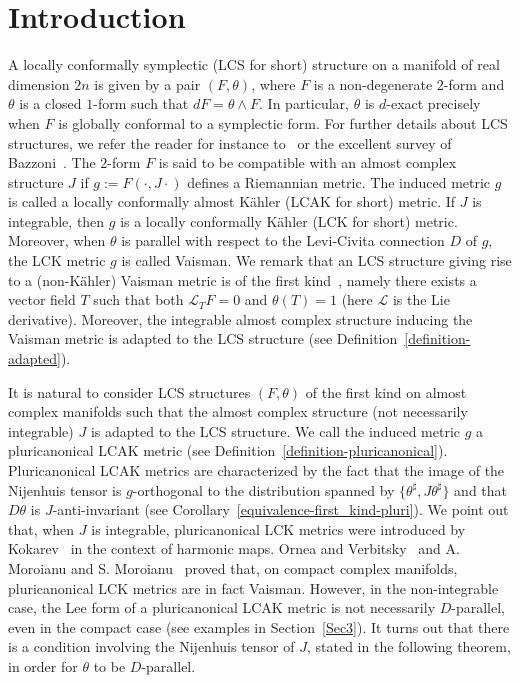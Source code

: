 \documentclass[a4paper,11pt]{amsart}
\theoremstyle{definition}
\renewcommand{\[}{\begin{equation*}}
\renewcommand{\]}{\end{equation*}}
\begin{document}
  \section{Introduction}
  A locally conformally symplectic (LCS for short) structure on a manifold of real dimension $2n$ is given by a pair $(F,\theta)$, where $F$ is a non-degenerate $2$-form and $\theta$ is a closed $1$-form such that $dF=\theta\wedge F.$ In particular, $\theta$ is $d$-exact precisely when $F$ is globally conformal to a symplectic form. For further details about LCS structures, we refer the reader for instance to~\cite{MR1481969,MR4771164} or the excellent survey of Bazzoni~\cite{MR3880223}. The $2$-form $F$ is said to be compatible with an almost complex structure $J$ if $g:=F(\cdot,J\cdot)$ defines a Riemannian metric. The induced metric $g$ is called a locally conformally almost K\"ahler (LCAK for short) metric. If $J$ is integrable, then $g$ is a locally conformally K\"ahler (LCK for short) metric. Moreover, when $\theta$ is parallel with respect to the Levi-Civita connection $D$ of $g$, the LCK metric $g$ is called Vaisman. We remark that an LCS structure giving rise to a (non-K\"ahler) Vaisman metric is of the first kind~\cite{MR809073}, namely there exists a vector field $T$ such that both $\mathcal{L}_TF=0$ and $\theta(T)=1$ (here $\mathcal{L}$ is the Lie derivative). Moreover, the integrable almost complex structure inducing the Vaisman metric is adapted to the LCS structure (see Definition~\ref{definition-adapted}).

  It is natural to consider LCS structures $(F,\theta)$ of the first kind on almost complex manifolds such that the almost complex structure (not necessarily integrable) $J$ is adapted to the LCS structure. We call the induced metric $g$ a pluricanonical LCAK metric (see Definition~\ref{definition-pluricanonical}). Pluricanonical LCAK metrics are characterized by the fact that the image of the Nijenhuis tensor is $g$-orthogonal to the distribution spanned by $\{\theta^\sharp,J\theta^\sharp\}$ and that $D\theta$ is $J$-anti-invariant (see Corollary~\ref{equivalence-first_kind-pluri}). We point out that, when $J$ is integrable, pluricanonical LCK metrics were introduced by Kokarev~\cite{MR2520354} in the context of harmonic maps. Ornea and Verbitsky~\cite{MR4771164} and A. Moroianu and S. Moroianu~\cite{MR3674175} proved that, on compact complex manifolds, pluricanonical LCK metrics are in fact Vaisman. However, in the non-integrable case, the Lee form of a pluricanonical LCAK metric is not necessarily $D$-parallel, even in the compact case (see examples in Section~\ref{Sec3}). It turns out that there is a condition involving the Nijenhuis tensor of $J$, stated in the following theorem, in order for $\theta$ to be $D$-parallel.
\end{document}
